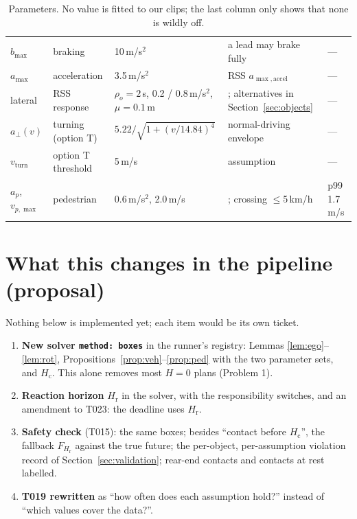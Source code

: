 \documentclass[11pt]{article}
\theoremstyle{definition}
\theoremstyle{remark}
\newcommand{\Hc}{H_{\mathrm{c}}}
\newcommand{\Hr}{H_{\mathrm{r}}}
\begin{document}
\begin{table}[h]
\begin{tabular}{p{2.0cm}p{3.4cm}p{3.2cm}p{4.6cm}p{2.2cm}}
$b_{\max}$ & braking & 10\,m/s$^2$ & a lead may brake fully \cite{unr157} & --- \\
$a_{\max}$ & acceleration & 3.5\,m/s$^2$ & RSS $a_{\max,\mathrm{accel}}$ \cite{adrsslib} & --- \\
lateral & RSS response & $\rho_o=2$\,s, 0.2 / 0.8\,m/s$^2$, $\mu=0.1$\,m & \cite{rss2017,adrsslib}; alternatives in Section~\ref{sec:objects} & --- \\
$a_\perp(v)$ & turning (option T) & $5.22/\sqrt{1+(v/14.84)^4}$ & normal-driving envelope \cite{bosetti2014} & --- \\
$v_{\mathrm{turn}}$ & option T threshold & 5\,m/s & assumption & --- \\
$a_p$, $v_{p,\max}$ & pedestrian & 0.6\,m/s$^2$, 2.0\,m/s & \cite{koschi2018}; crossing $\le$5\,km/h \cite{unr157} & p99 1.7\,m/s \\
\bottomrule
\end{tabular}
\caption{Parameters. No value is fitted to our clips; the last column only shows that none is wildly off.}
\label{tab:params}
\end{table}

\section{What this changes in the pipeline (proposal)}\label{sec:pipeline}
Nothing below is implemented yet; each item would be its own ticket.
\begin{enumerate}[leftmargin=*]
  \item \textbf{New solver \texttt{method: boxes}} in the runner's registry: Lemmas
    \ref{lem:ego}--\ref{lem:rot}, Propositions~\ref{prop:veh}--\ref{prop:ped} with the two parameter sets,
    and $\Hc$. This alone removes most $H=0$ plans (Problem 1).
  \item \textbf{Reaction horizon} $\Hr$ in the solver, with the responsibility switches, and an amendment to
    T023: the deadline uses $\Hr$.
  \item \textbf{Safety check} (T015): the same boxes; besides ``contact before $\Hc$'', the fallback
    $F_{\Hr}$ against the true future; the per-object, per-assumption violation record of
    Section~\ref{sec:validation}; rear-end contacts and contacts at rest labelled.
  \item \textbf{T019 rewritten} as ``how often does each assumption hold?'' instead of ``which values cover the
    data?''.
\end{enumerate}
\end{document}
